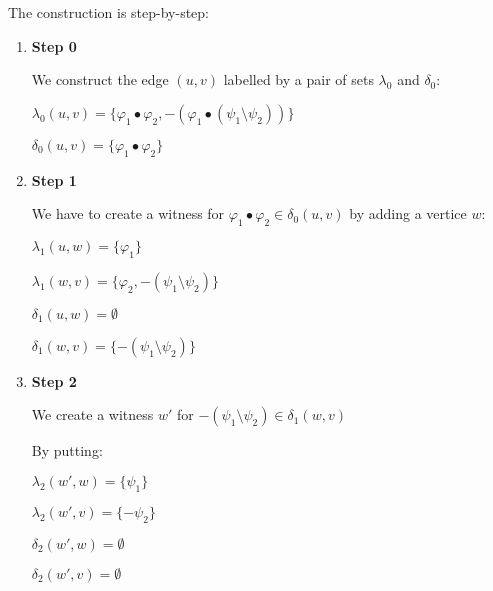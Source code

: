 \documentclass[a4paper]{article}
\theoremstyle{defin}
\theoremstyle{theorem}
\theoremstyle{claim}
\theoremstyle{prop}
\theoremstyle{lemma}
\theoremstyle{fact}
\theoremstyle{ex}
\theoremstyle{col}
\begin{document}
The construction is step-by-step:
\begin{enumerate}
\item {\bf Step 0}

We construct the edge $(u, v)$ labelled by a pair of sets $\lambda_0$ and $\delta_0$:

\centerline{
}

\begin{center}
$\lambda_{0}(u, v) = \{ \varphi_1 \bullet \varphi_2, -(\varphi_1 \bullet (\psi_1 \setminus \psi_2)) \}$

$\delta_{0}(u, v) = \{ \varphi_1 \bullet \varphi_2\}$
\end{center}

\item {\bf Step 1}

We have to create a witness for $\varphi_1 \bullet \varphi_2 \in \delta_{0}(u, v)$ by adding a vertice $w$:

\centerline{
}

\begin{center}
$\lambda_1(u, w) = \{ \varphi_1 \}$

$\lambda_1(w, v) = \{ \varphi_2, -(\psi_1 \setminus \psi_2)\}$

$\delta_1(u, w) = \emptyset$

$\delta_1(w, v) = \{ - (\psi_1 \setminus \psi_2) \}$
\end{center}

\item {\bf Step 2}

We create a witness $w'$ for $- (\psi_1 \setminus \psi_2) \in \delta_1(w, v)$

\centerline{
}

By putting:
\begin{center}
$\lambda_2(w', w) = \{ \psi_1 \}$

$\lambda_2(w', v) = \{ -\psi_2 \}$

$\delta_2(w', w) = \emptyset$

$\delta_2(w', v) = \emptyset$
\end{center}

\end{enumerate}
\end{document}
